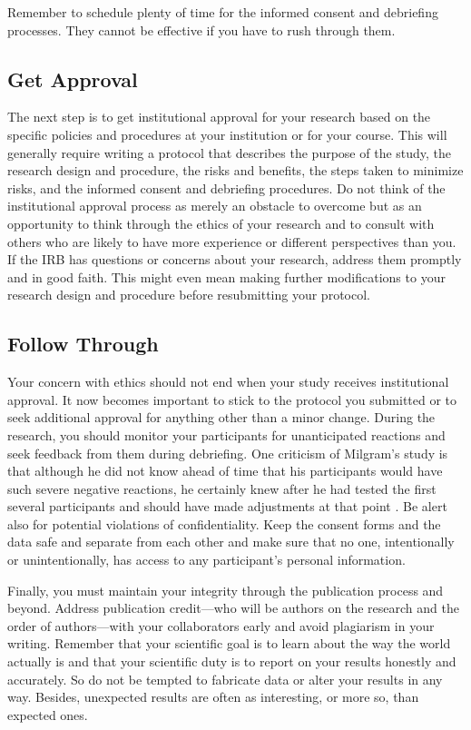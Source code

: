 Remember to schedule plenty of time for the informed consent and debriefing processes. They cannot be effective if you have to rush through them.

\subsection{Get Approval}

The next step is to get institutional approval for your research based on the specific policies and procedures at your institution or for your course. This will generally require writing a protocol that describes the purpose of the study, the research design and procedure, the risks and benefits, the steps taken to minimize risks, and the informed consent and debriefing procedures. Do not think of the institutional approval process as merely an obstacle to overcome but as an opportunity to think through the ethics of your research and to consult with others who are likely to have more experience or different perspectives than you. If the IRB has questions or concerns about your research, address them promptly and in good faith. This might even mean making further modifications to your research design and procedure before resubmitting your protocol.

\subsection{Follow Through}

Your concern with ethics should not end when your study receives institutional approval. It now becomes important to stick to the protocol you submitted or to seek additional approval for anything other than a minor change. During the research, you should monitor your participants for unanticipated reactions and seek feedback from them during debriefing. One criticism of Milgram's study is that although he did not know ahead of time that his participants would have such severe negative reactions, he certainly knew after he had tested the first several participants and should have made adjustments at that point \citep{baumrind_research_1985}. Be alert also for potential violations of confidentiality. Keep the consent forms and the data safe and separate from each other and make sure that no one, intentionally or unintentionally, has access to any participant's personal information.

Finally, you must maintain your integrity through the publication process and beyond. Address publication credit---who will be authors on the research and the order of authors---with your collaborators early and avoid plagiarism in your writing. Remember that your scientific goal is to learn about the way the world actually is and that your scientific duty is to report on your results honestly and accurately. So do not be tempted to fabricate data or alter your results in any way. Besides, unexpected results are often as interesting, or more so, than expected ones.


